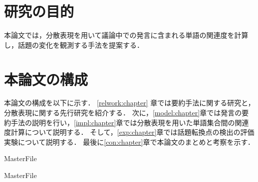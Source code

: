 \section{研究の目的}
\label{intro:taget}
本論文では，分散表現を用いて議論中での発言に含まれる単語の関連度を計算し，話題の変化を観測する手法を提案する．

\section{本論文の構成}
本論文の構成を以下に示す．
\ref{relwork:chapter} 章では要約手法に関する研究と，分散表現に関する先行研究を紹介する．
次に，\ref{model:chapter}章では発言の要約手法の説明を行い，\ref{impl:chapter}章では分散表現を用いた単語集合間の関連度計算について説明する．
そして，\ref{exp:chapter}章では話題転換点の検出の評価実験について説明する．
最後に\ref{con:chapter}章で本論文のまとめと考察を示す．

 \expandafter\ifx\csname MasterFile\endcsname\relax
	\def\BibFile{hoge}
	
  \fi
  \expandafter\ifx\csname MasterFile\endcsname\relax
  
  \fi
